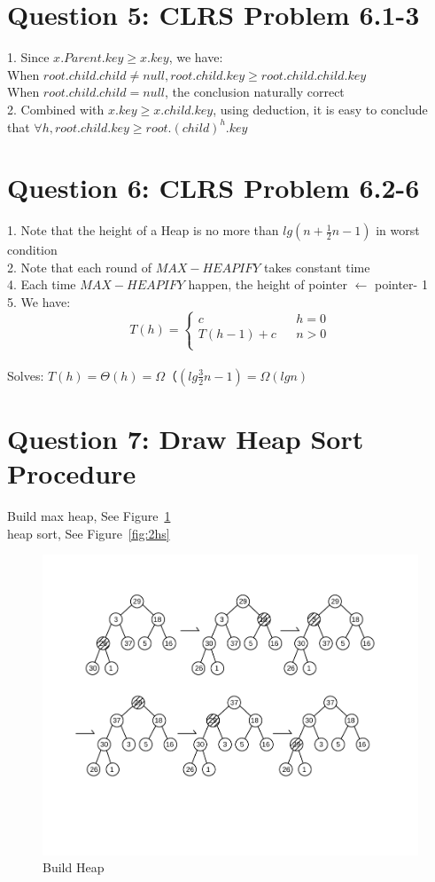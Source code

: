 \documentclass[]{article}
\begin{document}
\section{Question 5: CLRS Problem 6.1-3}
1. Since $x.Parent.key \ge x.key$, we have:\\
When $root.child.child \neq null, root.child.key \ge root.child.child.key$\\
When $root.child.child = null$, the conclusion naturally correct\\
2. Combined with $x.key \ge x.child.key$, using deduction, it is easy to conclude that $\forall h, root.child.key \ge root.(child)^{h}.key$

\section{Question 6: CLRS Problem 6.2-6}

1. Note that the height of a Heap is no more than $lg(n+\frac{1}{2}n - 1)$ in worst condition\\
2. Note that each round of $MAX-HEAPIFY$ takes constant time\\
4. Each time $MAX-HEAPIFY$ happen, the height of pointer $\leftarrow$ pointer- 1\\
5. We have:\\ 
	$$ T(h)=\left\{
	\begin{array}{lcl}
	c       &      & {h = 0}\\
	T(h - 1) + c     &      & {n > 0}\\
	\end{array} \right. $$\\

Solves: $T(h) = \Theta(h) = \Omega（(lg\frac{3}{2}n - 1) = \Omega (lgn)$

\section{Question 7: Draw Heap Sort Procedure}

Build max heap, See Figure~\ref{fig:2bh}\\
heap sort, See Figure~\ref{fig:2hs}

\begin{figure}
	\centering
	\includegraphics[width=0.9\linewidth]{2_build_heap}
	\caption{Build Heap}
	\label{fig:2bh}
\end{figure}
\end{document}
